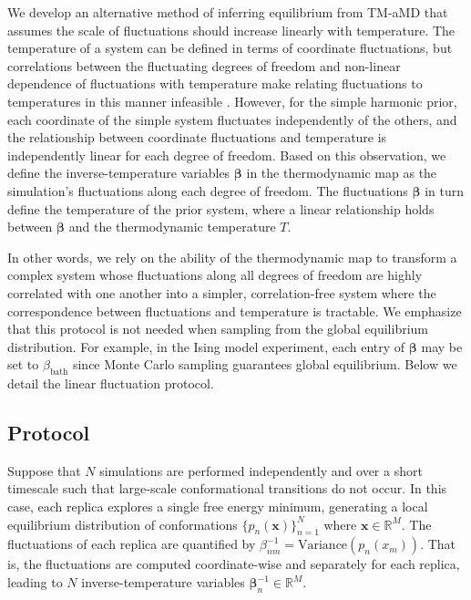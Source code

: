 We develop an alternative method of inferring equilibrium from TM-aMD that assumes the scale of fluctuations should increase linearly with temperature. The temperature of a system can be defined in terms of coordinate fluctuations, but correlations between the fluctuating degrees of freedom and non-linear dependence of fluctuations with temperature make relating fluctuations to temperatures in this manner infeasible \cite{landau-lifshitz}. However, for the simple harmonic prior, each coordinate of the simple system fluctuates independently of the others, and the relationship between coordinate fluctuations and temperature is independently linear for each degree of freedom. Based on this observation, we define the inverse-temperature variables $\bm{\beta}$ in the thermodynamic map as the simulation's fluctuations along each degree of freedom. The fluctuations $\bm{\beta}$ in turn define the temperature of the prior system, where a linear relationship holds between $\bm{\beta}$ and the thermodynamic temperature $T$.

In other words, we rely on the ability of the thermodynamic map to transform a complex system whose fluctuations along all degrees of freedom are highly correlated with one another into a simpler, correlation-free system where the correspondence between fluctuations and temperature is tractable. We emphasize that this protocol is not needed when sampling from the global equilibrium distribution. For example, in the Ising model experiment, each entry of $\bm{\beta}$ may be set to $\beta_{\mathrm{bath}}$ since Monte Carlo sampling guarantees global equilibrium. Below we detail the linear fluctuation protocol.

\subsection{Protocol}

Suppose that $N$ simulations are performed independently and over a short timescale such that large-scale conformational transitions do not occur. In this case, each replica explores a single free energy minimum, generating a local equilibrium distribution of conformations $\{ p_n(\mathbf{x}) \}_{n=1}^N$ where $\mathbf{x} \in \mathbb{R}^M$. The fluctuations of each replica are quantified by $\beta^{-1}_{nm} =  \mathrm{Variance}(p_n(x_m))$. That is, the fluctuations are computed coordinate-wise and separately for each replica, leading to $N$ inverse-temperature variables $\bm{\beta}_n^{-1} \in \mathbb{R}^M$.

